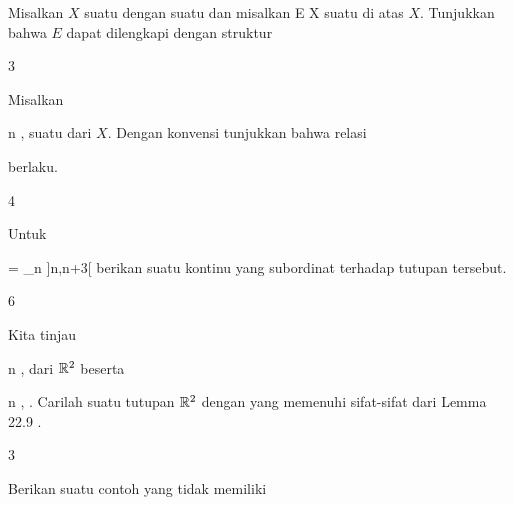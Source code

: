 {}
{

Misalkan $X$ suatu
dengan suatu
dan misalkan
 { E } { X
} {}
suatu
di atas $X$. Tunjukkan bahwa $E$ dapat dilengkapi dengan struktur

}
{} {}


{3}
{

Misalkan

 {}
 {n \in \N} {}
 {} {} {} {,}
suatu
 dari
 $X$. Dengan konvensi
tunjukkan bahwa relasi

 {  }
 berlaku.

}
{} {}

{4}
{

Untuk

\mavergleichskettedisp
{\vergleichskette
{ \R
}
{ =} { \bigcup_{n \in \Z} ]n,n+3[
}
{ } {
}
{ } {
}
{ } {
}
}
{}{}{}
berikan suatu
kontinu yang subordinat terhadap tutupan tersebut.

}
{} {}

{6}
{

Kita tinjau

 {}
 {n \in \N} {}
 {} {} {} {,}
dari ${\mathbb R}^2$ beserta

 {}
 {n \in \N} {}
 {} {} {} {,}
 {} {.}
Carilah suatu tutupan ${\mathbb R}^2$ dengan
yang memenuhi sifat-sifat
dari Lemma 22.9
 {} {}.

}
{} {}

{3}
{

Berikan suatu contoh
yang tidak memiliki

}
{} {}
